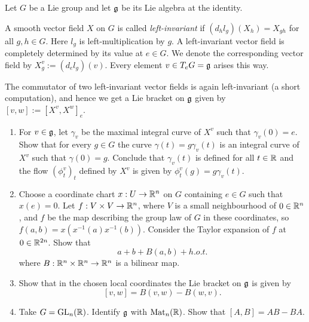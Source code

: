 \message{ !name(mangnotater.tex)}\documentclass[11pt, english]{article}
\begin{document}
\begin{exc}
Let $G$ be a Lie group and let $\mathfrak g$ be its Lie algebra at the identity.

A smooth vector field $X$ on $G$ is called \emph{left-invariant} if $(d_hl_g)(X_h)=X_{gh}$ for all $g,h \in G$. Here $l_g$ is left-multiplication by $g$. A left-invariant vector field is completely determined by its value at $e \in G$. We denote the corresponding vector field by $X^v_g := (d_el_g)(v)$. Every element $v \in T_e G=\mathfrak g$ arises this way. 

The commutator of two left-invariant vector fields is again left-invariant (a short computation), and hence we get a Lie bracket on $\mathfrak g$ given by $[v,w] := [X^v, X^w]_e$. 

\begin{enumerate}
\item For $v \in \mathfrak g$, let $\gamma_v$ be the maximal integral curve of $X^v$ such that $\gamma_v(0)=e$. Show that for every $g \in G$ the curve $\gamma(t)=g \gamma_v(t)$ is an integral curve of $X^v$ such that $\gamma(0)=g$. Conclude that $\gamma_v(t)$ is defined for all $t \in \mathbb{R}$ and the flow $(\phi_t^v)_t$ defined by $X^v$ is given by $\phi_t^v(g)=g\gamma_v(t)$. 

\item Choose a coordinate chart $x:U \to \mathbb{R}^n$ on $G$ containing $e \in G$ such that $x(e)=0$. Let $f:V \times V \to \mathbb{R}^n$, where $V$ is a small neighbourhood of $0 \in \mathbb{R}^n$, and $f$ be the map describing the group law of $G$ in these coordinates, so $f(a,b)=x(x^{-1}(a)x^{-1}(b))$. Consider the Taylor expansion of $f$ at $0 \in \mathbb{R}^{2n}$. Show that
$$
a+b+B(a,b)+h.o.t.
$$
where $B:\mathbb{R}^n \times \mathbb{R}^n \to \mathbb{R}^n$ is a bilinear map.

\item Show that in the chosen local coordinates the Lie bracket on $\mathfrak g$ is given by
\[
[v,w] = B(v,w) - B(w,v).
\]
\item Take $G=\operatorname{GL}_n(\mathbb{R})$. Identify $\mathfrak g$ with $\mathrm{Mat}_n(\mathbb{R})$. Show that $[A,B] = AB-BA$.
\end{enumerate}
\end{exc}


\end{document}
